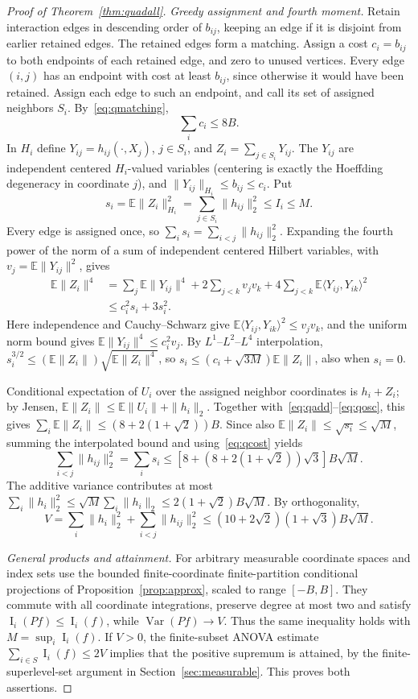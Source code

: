 \documentclass[11pt]{article}
\numberwithin{equation}{section}
\theoremstyle{remark}
\newcommand{\E}{\mathbb E}
\newcommand{\Var}{\operatorname{Var}}
\newcommand{\Inf}{\operatorname{I}}
\newcommand{\Aquad}{2(1+\sqrt2)}
\newcommand{\Dquad}{(10+2\sqrt2)(1+\sqrt3)}
\begin{document}
\begin{proof}[Proof of Theorem~\ref{thm:quadall}]
\emph{Greedy assignment and fourth moment.} Retain interaction edges in descending order of $b_{ij}$, keeping an edge if it is disjoint from earlier retained edges. The retained edges form a matching. Assign a cost $c_i=b_{ij}$ to both endpoints of each retained edge, and zero to unused vertices. Every edge $(i,j)$ has an endpoint with cost at least $b_{ij}$, since otherwise it would have been retained. Assign each edge to such an endpoint, and call its set of assigned neighbors $S_i$. By~\eqref{eq:qmatching},
\begin{equation}\label{eq:qcost}
 \sum_i c_i\le8B.
\end{equation}
In $H_i$ define $Y_{ij}=h_{ij}(\cdot,X_j)$, $j\in S_i$, and $Z_i=\sum_{j\in S_i}Y_{ij}$. The $Y_{ij}$ are independent centered $H_i$-valued variables (centering is exactly the Hoeffding degeneracy in coordinate $j$), and $\|Y_{ij}\|_{H_i}\le b_{ij}\le c_i$. Put
\[
 s_i=\E\|Z_i\|_{H_i}^2=\sum_{j\in S_i}\|h_{ij}\|_2^2\le I_i\le M.
\]
Every edge is assigned once, so $\sum_i s_i=\sum_{i<j}\|h_{ij}\|_2^2$. Expanding the fourth power of the norm of a sum of independent centered Hilbert variables, with $v_j=\E\|Y_{ij}\|^2$, gives
\begin{align*}
 \E\|Z_i\|^4&=\sum_j\E\|Y_{ij}\|^4
 +2\sum_{j<k}v_jv_k+4\sum_{j<k}\E\langle Y_{ij},Y_{ik}\rangle^2\\
 &\le c_i^2 s_i+3s_i^2.
\end{align*}
Here independence and Cauchy--Schwarz give $\E\langle Y_{ij},Y_{ik}\rangle^2\le v_jv_k$, and the uniform norm bound gives $\E\|Y_{ij}\|^4\le c_i^2v_j$. By $L^1$--$L^2$--$L^4$ interpolation,
$ s_i^{3/2}\le (\E\|Z_i\|)\sqrt{\E\|Z_i\|^4}$,
so $s_i\le (c_i+\sqrt{3M})\E\|Z_i\|$, also when $s_i=0$.

Conditional expectation of $U_i$ over the assigned neighbor coordinates is $h_i+Z_i$; by Jensen,
$\E\|Z_i\|\le\E\|U_i\|+\|h_i\|_2$.
Together with~\eqref{eq:qadd}--\eqref{eq:qosc}, this gives  $\sum_i\E\|Z_i\|\le(8+\Aquad)B$. Since also $\E\|Z_i\|\le\sqrt{s_i}\le\sqrt M$, summing the interpolated bound and using~\eqref{eq:qcost} yields
\[
 \sum_{i<j}\|h_{ij}\|_2^2=\sum_i s_i
 \le[8+(8+\Aquad)\sqrt3]B\sqrt M.
\]
The additive variance contributes at most
$\sum_i\|h_i\|_2^2\le\sqrt M\sum_i\|h_i\|_2\le\Aquad B\sqrt M$.
By orthogonality,
\[
 V=\sum_i\|h_i\|_2^2+\sum_{i<j}\|h_{ij}\|_2^2
 \le\Dquad B\sqrt M.
\]

\emph{General products and attainment.} For arbitrary measurable coordinate spaces and index sets use the bounded finite-coordinate finite-partition conditional projections of Proposition~\ref{prop:approx}, scaled to range $[-B,B]$. They commute with all coordinate integrations, preserve degree at most two and satisfy $\Inf_i(Pf)\le\Inf_i(f)$, while $\Var(Pf)\to V$. Thus the same inequality holds with $M=\sup_i\Inf_i(f)$. If $V>0$, the finite-subset ANOVA estimate $\sum_{i\in S}\Inf_i(f)\le2V$ implies that the positive supremum is attained, by the finite-superlevel-set argument in Section~\ref{sec:measurable}. This proves both assertions.
\end{proof}
\end{document}

